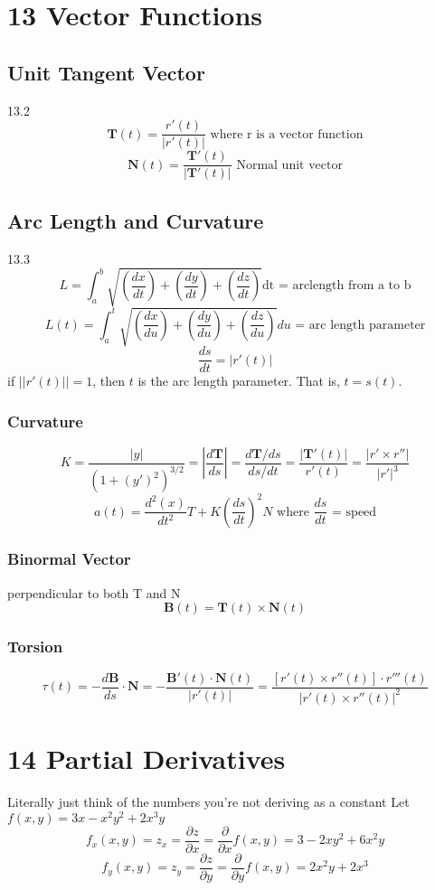 \documentclass{report}
\newcommand{\pdif}[2]{ \frac{\partial #1}{ \partial #2} }
\newcommand{\pderiv}[1]{ \frac{\partial}{ \partial #1} }
\begin{document}
\chapter{13 Vector Functions}
\section{Unit Tangent Vector}
13.2
$$
\mathbf{T}(t) = \frac{r'(t)}{|r'(t)|} \text{ where r is a vector function}
$$
$$
\mathbf{N}(t) = \frac{\mathbf{T}'(t)}{|\mathbf{T}'(t)|} \text{ Normal unit vector}
$$

\section{Arc Length and Curvature}
13.3
$$
L = \int_a^b \sqrt{(\frac{dx}{dt}) + (\frac{dy}{dt}) + (\frac{dz}{dt})} \text{dt = arclength from a to b}
$$
$$
L(t) = \int_a^t \sqrt{(\frac{dx}{du}) + (\frac{dy}{du}) + (\frac{dz}{du})} du \text{ = arc length parameter}
$$
$$
\frac{ds}{dt} = |r'(t)|
$$
if $||r'(t)|| = 1$, then $t$ is the arc length parameter. That is, $t = s(t)$.

\subsection{Curvature}
$$
K = \frac{|y|}{(1+(y')^2)^{3/2}} = |\frac{d\mathbf{T}}{ds}| = \frac{d\mathbf{T}/ds}{ds/dt} = \frac{|\mathbf{T}'(t)|}{r'(t)}
 = \frac{|r' \times r''|}{|r'|^3}
$$
$$
a(t) = \frac{d^2(x)}{dt^2}T + K\left( \frac{ds}{dt}\right)^2N \text{ where $\frac{ds}{dt}$ = speed}
$$

\subsection{Binormal Vector}
perpendicular to both T and N
$$
\mathbf{B}(t) = \mathbf{T}(t) \times \mathbf{N}(t)
$$

\subsection{Torsion}
$$
\tau(t) = -\frac{d\mathbf{B}}{ds} \cdot \mathbf{N} = 
-\frac{\mathbf{B}'(t) \cdot \mathbf{N}(t)}{|r'(t)|} =
\frac{[ r'(t) \times r''(t)] \cdot r'''(t)}{|r'(t) \times r''(t)|^2}
$$


\chapter{14 Partial Derivatives}
Literally just think of the numbers you're not deriving as a constant
Let $f(x, y) = 3x - x^2y^2 + 2x^3y$
$$
f_x(x, y) = z_x = \pdif{z}{x} = \pderiv{x} f(x, y) = 3 - 2xy^2 + 6x^2y
$$
$$
f_y(x, y) = z_y = \pdif{z}{y} = \pderiv{y} f(x, y) = 2x^2y + 2x^3
$$
\end{document}
